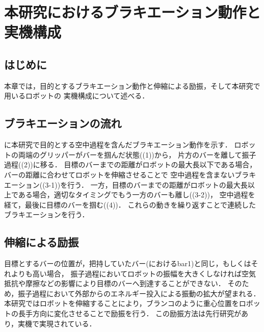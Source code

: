 \chapter[本研究におけるブラキエーション動作と実機構成]%
        {本研究におけるブラキエーション動作と\\実機構成}
        \section{はじめに}
          
          本章では，目的とするブラキエーション動作と伸縮による励振，そして本研究で用いるロボットの
          実機構成について述べる．


        \section{ブラキエーションの流れ}

          に本研究で目的とする空中過程を含んだブラキエーション動作を示す．
          ロボットの両端のグリッパーがバーを掴んだ状態((1))から，
          片方のバーを離して振子過程((2))に移る．
          目標のバーまでの距離がロボットの最大長以下である場合，バーの距離に合わせてロボットを伸縮させることで
          空中過程を含まないブラキエーション((3-1))を行う．
          一方，目標のバーまでの距離がロボットの最大長以上である場合，適切なタイミングでもう一方のバーも離し((3-2))，
          空中過程を経て，最後に目標のバーを掴む((4))．
          これらの動きを繰り返すことで連続したブラキエーションを行う．

        \section{伸縮による励振}
          
          目標とするバーの位置が，把持していたバー(におけるbar1)と同じ，もしくはそれよりも高い場合，
          振子過程においてロボットの振幅を大きくしなければ空気抵抗や摩擦などの影響により目標のバーへ到達することができない．
          そのため，振子過程において外部からのエネルギー投入による振動の拡大が望まれる．
          本研究ではロボットを伸縮することにより，ブランコのように重心位置をロボットの長手方向に変化させることで励振を行う．
          この励振方法は先行研究があり，実機で実現されている\cite{Hijiri:Robomech2024}．
          
